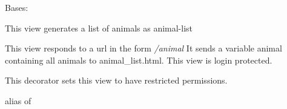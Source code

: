 \documentclass[letterpaper,10pt,english]{sphinxmanual}
\begin{document}
\begin{fulllineitems}
\label{api:mousedb.animal.views.AnimalList}
Bases: {\hyperref[api:mousedb.views.ProtectedListView]{}}

This view generates a list of animals as animal-list

This view responds to a url in the form \emph{/animal}
It sends a variable animal containing all animals to animal\_list.html.
This view is login protected.

\begin{fulllineitems}
\label{api:mousedb.animal.views.AnimalList.allow_empty}
\end{fulllineitems}


\begin{fulllineitems}
\label{api:mousedb.animal.views.AnimalList.context_object_name}
\end{fulllineitems}


\begin{fulllineitems}
\label{api:mousedb.animal.views.AnimalList.dispatch}
This decorator sets this view to have restricted permissions.

\end{fulllineitems}


\begin{fulllineitems}
\label{api:mousedb.animal.views.AnimalList.model}
alias of 

\end{fulllineitems}


\begin{fulllineitems}
\label{api:mousedb.animal.views.AnimalList.template_name}
\end{fulllineitems}


\end{fulllineitems}
\end{document}
